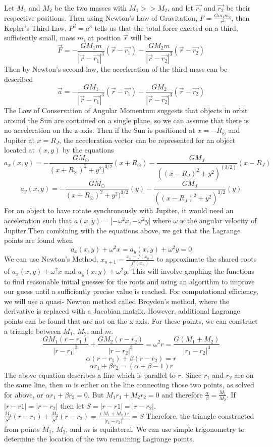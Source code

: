 \documentclass[linenumbers,RNAAS,trackchanges]{aastex631}
\begin{document}
Let $M_{1}$ and $M_{2}$  be the two masses with $M_{1} >> M_{2}$, and let $\vec{r_1}$ and $\vec{r_2}$ be their respective positions. Then using Newton's Law of Gravitation, $F=\frac{Gm_1 m_2}{r^2}$, then Kepler's Third Law, $P^2=a^3$ tells us that the total force exerted on a third, sufficiently small, mass $m$, at position $\vec{r}$ will be
$$\vec{F}=-\frac{GM_1 m}{|\vec{r}-\vec{r_1 } |^3}  (\vec{r }-\vec{r_1})-\frac{GM_2 m}{|\vec{r}-\vec{r_2 } |^3}  (\vec{r }-\vec{r_2})$$
Then by Newton's second law, the acceleration of the third mass can be described 
$$\vec{a}=-\frac{GM_1}{|\vec{r}-\vec{r_1}|^3}  (\vec{r}-\vec{r_1})-\frac{GM_2}{|\vec{r}-\vec{r_2}|^3}(\vec{r}-\vec{r_2})$$
The Law of Conservation of Angular Momentum suggests that objects in orbit around the Sun are contained on a single plane, so we can assume that there is no acceleration on the z-axis. Then if the Sun is positioned at $x=-R_\odot$ and Jupiter at $x=R_J$, the acceleration vector can be represented for an object located at $(x,y)$ by the equations
\[a_x (x,y)=-\frac{GM_\odot}{(x+R_\odot)^2+y^2 )^{3/2}}  (x+R_\odot)-
\frac{GM_J}{((x-R_J )^2+y^2 )^(3/2)}(x-R_J )\]
\[a_y (x,y)=-\frac{GM_\odot}{(x+R_\odot)^2+y^2 )^{3/2}}(y)-\frac{GM_J}{((x-R_J )^2+y^2 )^{3/2}} (y)\]
For an object to have rotate synchronously with Jupiter, it would need an acceleration such that $a(x,y)=[-\omega^2 x,-\omega^2 y$]  where $\omega$ is the angular velocity of Jupiter.Then combining with the equations above, we get that the Lagrange points are found when 
$$a_x (x,y)+\omega^2 x=a_y (x,y)+\omega^2 y=0$$
We can use Newton's Method, $x_{n+1}=\frac{x_n-f(x_n)}{f'(x_n)}$  to approximate the shared roots of $a_x (x,y)+\omega^2 x$ and $a_y (x,y)+\omega^2 y$. This will involve graphing the functions to find reasonable initial guesses for the roots and using an algorithm to improve our guess until a sufficiently precise value is reached. For computational efficiency, we will use a quasi- Newton method called Broyden's method, where the derivative is replaced with a Jacobian matrix. However, additional Lagrange points can be found that are not on the x-axis. For these points, we can construct a triangle between $M_{1}$, $M_{2}$, and $m$. 
$$\frac{GM_{1}(r-r_{1})}{|r-r_{1}|^3}+\frac{GM_{2}(r-r_{2})}{|r-r_{2}|^3}=\omega^2r=\frac{G(M_{1}+M_{2})}{|r_{1}-r_{2}|^3}$$
$$\alpha(r-r_{1})+\beta(r-r_{2})=r$$
$$\alpha r_{1} + \beta r_{2}=(\alpha + \beta -1)r$$ The above equation describes a line which is parallel to $r$. Since $r_{1}$ and $r_{2}$ are on the same line, then $m$ is either on the line connecting those two points, as solved for above, or $\alpha r_{1} + \beta r_{2}=0$. But $M_{1}r_{1} + M_{2}r_{2}=0$ and therefore $\frac{\alpha}{\beta}=\frac{M_{1}}{M_{2}}$. If $|r-r{1}|=|r-r_{2}|$ then let $S=|r-r{1}|=|r-r_{2}|$.
$\frac{M_1}{S^3}(r-r_{1})+\frac{M_2}{{S^3}}(r-r_{2})=\frac{(M_{1}+M_{2})r}{|r_{1}-r_{2}|^3}=S$
Therefore, the triangle constructed from points $M_{1}$, $M_{2}$, and $m$ is equilateral. We can use simple trigonometry to determine the location of the two remaining Lagrange points.
\end{document}
